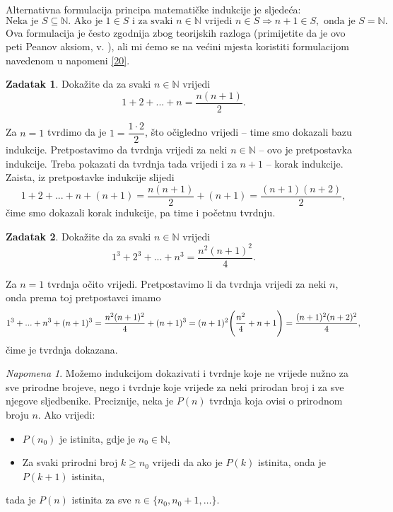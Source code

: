 \documentclass{book}
\let\originalleft\left
\let\originalright\right
\renewcommand{\left}{\mathopen{}\mathclose\bgroup\originalleft}
\renewcommand{\right}{\aftergroup\egroup\originalright}
\renewenvironment{proof}{%
    \vspace{-\parskip}\begin{oldproof}%
    }{%
    \end{oldproof}%
}
\theoremstyle{definition}
\theoremstyle{definition}
\newtheorem{exercise}{Zadatak}
\theoremstyle{remark}
\newtheorem{remark}{Napomena}
\begin{document}
Alternativna formulacija principa matematičke indukcije je sljedeća:
$$\text{Neka je }S\subseteq \mathbb{N}. \text{ Ako je }1\in S\text{ i za svaki }n\in \mathbb{N}\text{ vrijedi } n\in S\Rightarrow n+1\in S,\text{ onda je }S=\mathbb{N}.$$
Ova formulacija je često zgodnija zbog teorijskih razloga (primijetite da je ovo peti Peanov aksiom, v. \cite{3}), ali mi ćemo se na većini mjesta koristiti formulacijom navedenom u napomeni \ref{20}.
\begin{exercise}
Dokažite da za svaki $n\in \mathbb{N}$ vrijedi
$$1+2+...+n=\dfrac{n(n+1)}{2}.$$
\end{exercise}
\begin{proof}[Rješenje]
Za $n=1$ tvrdimo da je $1=\dfrac{1\cdot 2}{2}$, što očigledno vrijedi -- time smo dokazali bazu indukcije. Pretpostavimo da tvrdnja vrijedi za neki $n\in \mathbb{N}$ -- ovo je pretpostavka indukcije. Treba pokazati da tvrdnja tada vrijedi i za $n+1$ -- korak indukcije. Zaista, iz pretpostavke indukcije slijedi
$$1+2+...+n+(n+1)=\dfrac{n(n+1)}{2}+(n+1)=\dfrac{(n+1)(n+2)}{2},$$
čime smo dokazali korak indukcije, pa time i početnu tvrdnju.
\end{proof}
\begin{exercise}
Dokažite da za svaki $n\in \mathbb{N}$ vrijedi
$$1^3+2^3+...+n^3=\dfrac{n^2(n+1)^2}{4}.$$
\end{exercise}
\begin{proof}[Rješenje]
Za $n=1$ tvrdnja očito vrijedi. Pretpostavimo li da tvrdnja vrijedi za neki $n$, onda prema toj pretpostavci imamo
$$1^3+...+n^3+(n+1)^3=\dfrac{n^2(n+1)^2}{4}+(n+1)^3=(n+1)^2\left(\dfrac{n^2}{4}+n+1\right)=\dfrac{(n+1)^2(n+2)^2}{4},$$
čime je tvrdnja dokazana.
\end{proof}
\begin{remark}
\label{21}
Možemo indukcijom dokazivati i tvrdnje koje ne vrijede nužno za sve prirodne brojeve, nego i tvrdnje koje vrijede za neki prirodan broj i za sve njegove sljedbenike. Preciznije, neka je $P(n)$ tvrdnja koja ovisi o prirodnom broju $n$. Ako vrijedi:
\begin{itemize}
\item $P(n_0)$ je istinita, gdje je $n_0\in \mathbb{N}$,
\item Za svaki prirodni broj $k\geq n_0$ vrijedi da ako je $P(k)$ istinita, onda je $P(k+1)$ istinita,
\end{itemize}
tada je $P(n)$ istinita za sve $n\in \{n_0, n_0+1,\dots\}$.
\end{remark}
\end{document}

